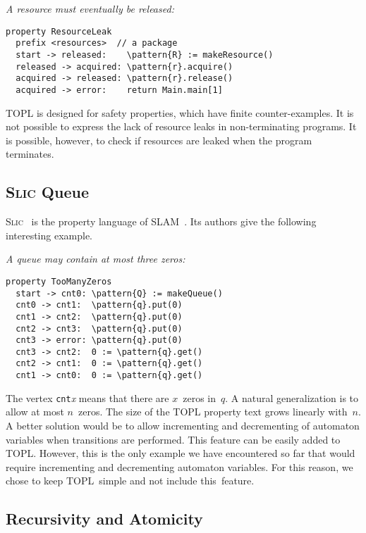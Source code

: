 \documentclass{sigplanconf} %
\newcommand{\TPL}{TOPL}
\newcommand{\delimitVerbatim}{\par\nobreak\smallskip\noindent}
\newcommand{\pattern}[1]{\ensuremath{\mathtt{\underline{#1}}}}
\theoremstyle{definition}
\theoremstyle{remark}
\begin{document}
\medskip\emph{A resource must eventually be released:}
\delimitVerbatim
\begin{Verbatim}[commandchars=\\\{\}]
property ResourceLeak
  prefix <resources>  // a package
  start -> released:    \pattern{R} := makeResource()
  released -> acquired: \pattern{r}.acquire()
  acquired -> released: \pattern{r}.release()
  acquired -> error:    return Main.main[1]
\end{Verbatim}
\delimitVerbatim
TOPL is designed for safety properties, which have finite counter-examples.
It is not possible to express the lack of resource leaks in non-terminating programs.
It is possible, however, to check if resources are leaked when the program terminates.

\subsection{\textsc{Slic} Queue} %

\textsc{Slic}~\cite{ball2002} is the property language of SLAM~\cite{dblp:conf/cav/ballr01}.
Its authors give the following interesting example.

\medskip\emph{A queue may contain at most three zeros:}
\delimitVerbatim
\begin{Verbatim}[commandchars=\\\{\}]
property TooManyZeros
  start -> cnt0: \pattern{Q} := makeQueue()
  cnt0 -> cnt1:  \pattern{q}.put(0)
  cnt1 -> cnt2:  \pattern{q}.put(0)
  cnt2 -> cnt3:  \pattern{q}.put(0)
  cnt3 -> error: \pattern{q}.put(0)
  cnt3 -> cnt2:  0 := \pattern{q}.get()
  cnt2 -> cnt1:  0 := \pattern{q}.get()
  cnt1 -> cnt0:  0 := \pattern{q}.get()
\end{Verbatim}
\delimitVerbatim
The vertex \texttt{cnt}\textit{x} means that there are $x$~zeros in~$q$.
A natural generalization is to allow at most $n$~zeros.
The size of the TOPL property text grows linearly with~$n$.
A better solution would be to allow incrementing and decrementing of automaton variables when transitions are performed.
This feature can be easily added to TOPL\null.
However, this is the only example we have encountered so far that would require incrementing and decrementing automaton variables.
For this reason, we chose to keep \TPL \ simple and not include this~feature.

\subsection{Recursivity and Atomicity}\label{sec:examples.ho} %
\end{document}
